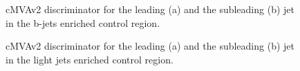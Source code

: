 \begin{figure}[htb]
\centering
{}
\caption{cMVAv2 discriminator for the leading (a) and the subleading (b)
jet in the b-jets enriched control region.\label{fig:bpogSF}}
\end{figure}
\begin{figure}[htb]
\centering
{}
\caption{cMVAv2 discriminator for the leading (a) and the subleading (b)
jet in the light jets enriched control region.\label{fig:bpogSF_Z}}
\end{figure}




